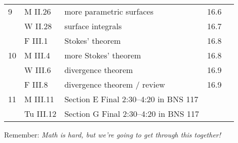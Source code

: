 \documentclass[11pt,twoside]{amsart}
\begin{document}
\begin{center}
\begin{longtable}{lllll}
9 &M II.26 &more parametric surfaces &16.6\\
&W II.28 &surface integrals &16.7\\
&F III.1 &Stokes' theorem &16.8\\ \midrule
10 &M III.4 &more Stokes' theorem &16.8\\
&W III.6 &divergence theorem &16.9\\
&F III.8 &divergence theorem / review &16.9\\ \midrule
11 &M III.11 & Section E Final 2:30--4:20 in BNS 117\\
&Tu III.12 & Section G Final 2:30--4:20 in BNS 117\\ \bottomrule
\end{longtable}
\end{center}

\bigskip \bigskip
\bigskip \bigskip

\begin{center}
Remember: \emph{Math is hard, but we're going to get through this together!}
\end{center}
\end{document}

